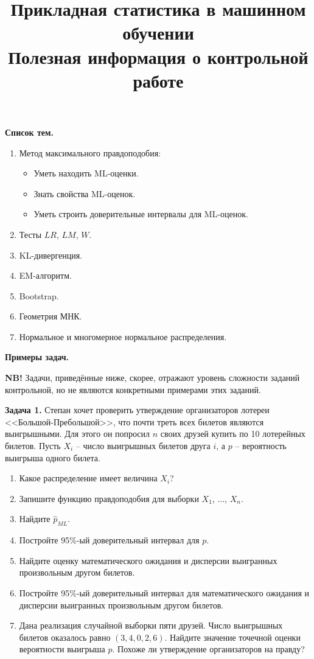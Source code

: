 \documentclass[10pt, a4paper]{extarticle}
\title{{\normalsize Прикладная статистика в машинном обучении} \\ \vspace{0.5em} Полезная информация о контрольной работе}
\author{\rule{15cm}{0.4pt}}
\begin{document}
	
	\maketitle

	{\Large \textbf{Список тем.}}
	
	\begin{enumerate}
		\item Метод максимального правдоподобия:
		\begin{itemize}
			\item Уметь находить ML-оценки.
			\item Знать свойства ML-оценок.
			\item Уметь строить доверительные интервалы для ML-оценок.
		\end{itemize}
		\item Тесты $LR$, $LM$, $W$.
		\item KL-дивергенция.
		\item EM-алгоритм. 
		\item Bootstrap.
		\item Геометрия МНК. 
		\item Нормальное и многомерное нормальное распределения.
	\end{enumerate}
	\vspace{2em}

	{\Large \textbf{Примеры задач.}}
	
	\textbf{NB!} Задачи, приведённые ниже, скорее, отражают уровень сложности заданий контрольной, но не являются конкретными примерами этих заданий. 
	\vspace{1em}
	
	{\large \textbf{Задача 1.}} Степан хочет проверить утверждение организаторов лотереи <<Большой-Пребольшой>>, что почти треть всех билетов являются выигрышными. Для этого он попросил $n$ своих друзей купить по 10 лотерейных билетов. Пусть $X_i$ -- число выигрышных билетов друга $i$, а $p$ -- вероятность выигрыша одного билета. 
	
	\begin{enumerate}
		\item Какое распределение имеет величина $X_i$?
		\item Запишите функцию правдоподобия для выборки $X_1$, $\ldots$, $X_n$.
		\item Найдите $\hat{p}_{ML}$.
		\item Постройте 95\%-ый доверительный интервал для $p$.
		\item Найдите оценку математического ожидания и дисперсии выигранных произвольным другом билетов. 
		\item Постройте 95\%-ый доверительный интервал для математического ожидания и дисперсии выигранных произвольным другом билетов.
		\item Дана реализация случайной выборки пяти друзей. Число выигрышных билетов оказалось равно $(3, 4, 0, 2, 6)$. Найдите значение точечной оценки вероятности выигрыша $p$. Похоже ли утверждение организаторов на правду? 
	\end{enumerate}
	\vspace{1em}
	
\end{document}
